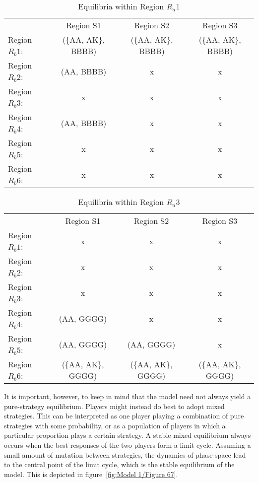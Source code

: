 \documentclass[a4paper,12pt]{article}
\numberwithin{equation}{section}
\begin{document}
\begin{table}[h]
\begin{center}
\begin{tabular}{lccc}
 & Region S1 & Region S2 & Region S3\\
Region $R_{b}1$: & (\{AA, AK\}, BBBB) & (\{AA, AK\}, BBBB) & (\{AA, AK\}, BBBB)\\
Region $R_{b}2$: & (AA, BBBB) & x & x\\
Region $R_{b}3$: & x & x & x\\
Region $R_{b}4$: & (AA, BBBB) & x & x\\
Region $R_{b}5$: & x & x & x\\
Region $R_{b}6$: & x & x & x
\end{tabular}
\end{center}
\caption{Equilibria within Region $R_{a}1$}
\label{tab:CueGamewithObservableAmplification/EquilibriaRa1}
\end{table}

\begin{table}[h]
\begin{center}
\begin{tabular}{lccc}
 & Region S1 & Region S2 & Region S3\\
Region $R_{b}1$: & x & x & x\\
Region $R_{b}2$: & x & x & x\\
Region $R_{b}3$: & x & x & x\\
Region $R_{b}4$: & (AA, GGGG) & x & x\\
Region $R_{b}5$: & (AA, GGGG) & (AA, GGGG) & x\\
Region $R_{b}6$: & (\{AA, AK\}, GGGG) & (\{AA, AK\}, GGGG) & (\{AA, AK\}, GGGG)
\end{tabular}
\end{center}
\caption{Equilibria within Region $R_{a}3$}
\label{tab:CueGamewithObservableAmplification/EquilibriaRa3}
\end{table}

It is important, however, to keep in mind that the model need not always yield a pure-strategy equilibrium. Players might instead do best to adopt mixed strategies. This can be interpreted as one player playing a combination of pure strategies with some probability, or as a population of players in which a particular proportion plays a certain strategy. A stable mixed equilibrium always occurs when the best responses of the two players form a limit cycle. Assuming a small amount of mutation between strategies, the dynamics of phase-space lead to the central point of the limit cycle, which is the stable equilibrium of the model. This is depicted in figure~\ref{fig:Model 1/Figure 67}.
\end{document}
